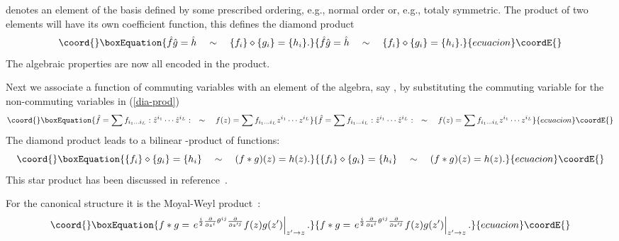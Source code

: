 \documentclass[a4paper,11pt]{article}
\def\z{\hat z}
\def\pat{\partial}
\begin{document}
\myHighlight{$:\z^{i_1}\cdots \z^{i_L}:$}\coordHE{} denotes an element of the basis defined 
by some prescribed ordering, e.g., normal order \coordHE{} or,
e.g., totaly symmetric.   The product of two elements will have its own
coefficient function, this defines the diamond product
\begin{equation}\coord{}\boxEquation{
  \hat{f}\hat{g}=\hat{h}\quad\sim\quad\{f_i\}\diamond\{g_i\}=\{h_i\}.
}{
  \hat{f}\hat{g}=\hat{h}\quad\sim\quad\{f_i\}\diamond\{g_i\}=\{h_i\}.
}{ecuacion}\coordE{}\end{equation}
The algebraic properties are now all encoded in the
\myHighlight{$\diamond$}\coordHE{} product. 

Next we associate a function \coordHE{} of commuting variables with 
an element of the algebra, say \coordHE{}, by substituting 
the commuting variable \coordHE{} for the non-commuting variables
in (\ref{dia-prod}) 
\begin{equation}\coord{}\boxEquation{
  \hat{f}=\sum f_{i_1\ldots i_L}:\z^{i_1}\cdots\z^{i_L}:\quad\sim\quad f(z)=\sum f_{i_1\ldots i_L}z^{i_1}\cdots z^{i_L}
}{
  \hat{f}=\sum f_{i_1\ldots i_L}:\z^{i_1}\cdots\z^{i_L}:\quad\sim\quad f(z)=\sum f_{i_1\ldots i_L}z^{i_1}\cdots z^{i_L}
}{ecuacion}\coordE{}\end{equation}
The diamond product leads to a bilinear \myHighlight{$*$}\coordHE{}-product of functions:
\begin{equation}\coord{}\boxEquation{
  \{f_i\}\diamond\{g_i\}=\{h_i\}\quad\sim\quad (f*g)(z)=h(z).
}{
  \{f_i\}\diamond\{g_i\}=\{h_i\}\quad\sim\quad (f*g)(z)=h(z).
}{ecuacion}\coordE{}\end{equation}
This star product has been discussed in reference~\cite{MSSW}.

For the canonical structure it is the Moyal-Weyl
product~\cite{Weyl,Wigner,Moyal}: 
\begin{equation}\coord{}\boxEquation{
\label{MoWe-prod}
  f*g=\left.e^{\frac{i}{2}\frac{\pat}{\pat z^i}\theta^{ij}\frac{\pat}{\pat z'^j}}f(z)g(z')\right|_{z'\to z}.
}{
f*g=\left.e^{\frac{i}{2}\frac{\pat}{\pat z^i}\theta^{ij}\frac{\pat}{\pat z'^j}}f(z)g(z')\right|_{z'\to z}.
}{ecuacion}\coordE{}\end{equation}
\end{document}
